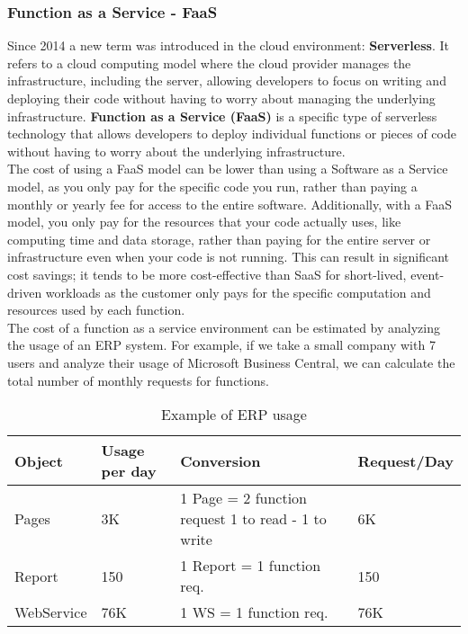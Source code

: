 \subsubsection{Function as a Service - FaaS}
Since 2014 a new term was introduced in the cloud environment: \textbf{Serverless}. It refers to a cloud computing model where the cloud provider manages the infrastructure, including the server, allowing developers to focus on writing and deploying their code without having to worry about managing the underlying infrastructure. \textbf{Function as a Service (FaaS)} is a specific type of serverless technology that allows developers to deploy individual functions or pieces of code without having to worry about the underlying infrastructure.\\
The cost of using a FaaS model can be lower than using a Software as a Service model, as you only pay for the specific code you run, rather than paying a monthly or yearly fee for access to the entire software. Additionally, with a FaaS model, you only pay for the resources that your code actually uses, like computing time and data storage, rather than paying for the entire server or infrastructure even when your code is not running. This can result in significant cost savings; it tends to be more cost-effective than SaaS for short-lived, event-driven workloads as the customer only pays for the specific computation and resources used by each function.\\
The cost of a function as a service environment can be estimated by analyzing the usage of an ERP system. For example, if we take a small company with 7 users and analyze their usage of Microsoft Business Central, we can calculate the total number of monthly requests for functions.
\newpage
\begin{table}
    \centering
    \begin{tabular}{p{2cm} | p{2.5cm} | p{4.5cm} | p{2.5cm}}
        \hline\hline
        Object     & Usage per day & Conversion                                         & Request/Day \\
        \hline
        Pages      & 3K            & 1 Page = 2 function request 1 to read - 1 to write & 6K          \\
        Report     & 150           & 1 Report = 1 function req.                         & 150         \\
        WebService & 76K           & 1 WS = 1 function req.                             & 76K         \\
        \hline \hline
    \end{tabular}
    \caption{Example of ERP usage}
    \label{tab:table_ERP_usage}
\end{table}
